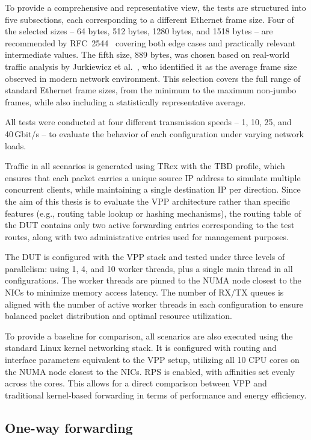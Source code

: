 To provide a comprehensive and representative view, the tests are structured into five subsections, each corresponding to a different Ethernet frame size. 
Four of the selected sizes -- 64 bytes, 512 bytes, 1280 bytes, and 1518 bytes -- are recommended by RFC~2544~\cite{rfc2544} 
covering both edge cases and practically relevant intermediate values. 
The fifth size, 889 bytes, was chosen based on real-world traffic analysis by Jurkiewicz et al.~\cite{JURKIEWICZ202115}, who identified it as the average frame size observed in modern network environment.
This selection covers the full range of standard Ethernet frame sizes, from the minimum to the maximum non-jumbo frames, 
while also including a statistically representative average.

All tests were conducted at four different transmission speeds -- 1, 10, 25, and 40 Gbit/s -- to evaluate the behavior of each configuration under varying network loads.

Traffic in all scenarios is generated using TRex with the TBD profile,
which ensures that each packet carries a unique source IP address to simulate multiple concurrent clients, while maintaining a single destination IP per direction.
Since the aim of this thesis is to evaluate the VPP architecture rather than specific features (e.g., routing table lookup or hashing mechanisms),
the routing table of the DUT contains only two active forwarding entries corresponding to the test routes,
along with two administrative entries used for management purposes.

The DUT is configured with the VPP stack and tested under three levels of parallelism: using 1, 4, and 10 worker threads, plus a single main thread in all configurations.
The worker threads are pinned to the NUMA node closest to the NICs to minimize memory access latency.
The number of RX/TX queues is aligned with the number of active worker threads in each configuration to ensure balanced packet distribution and optimal resource utilization.

To provide a baseline for comparison, all scenarios are also executed using the standard Linux kernel networking stack.
It is configured with routing and interface parameters equivalent to the VPP setup, utilizing all 10 CPU cores on the NUMA node closest to the NICs.
RPS is enabled, with affinities set evenly across the cores.
This allows for a direct comparison between VPP and traditional kernel-based forwarding in terms of performance and energy efficiency.

\subsection{One-way forwarding}


